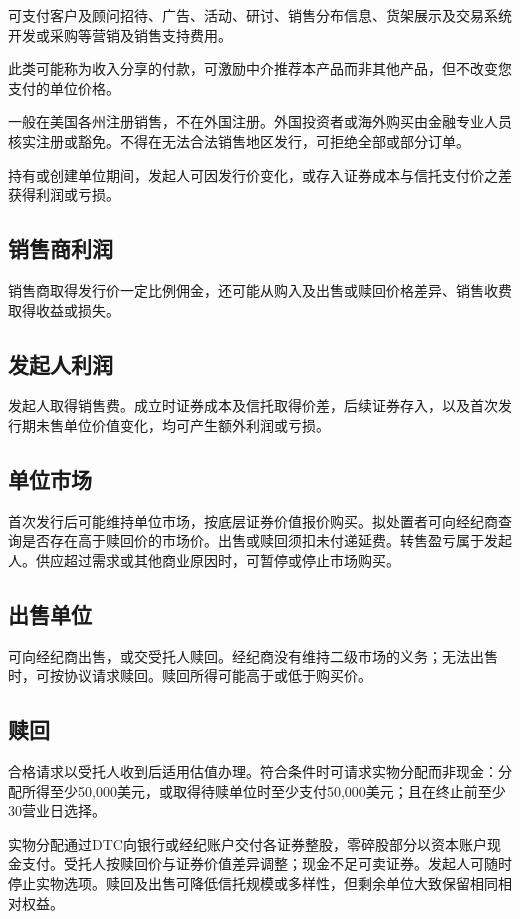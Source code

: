 \documentclass[UTF8,fontset=none,11pt,a4paper]{ctexart}
\begin{document}
可支付客户及顾问招待、广告、活动、研讨、销售分布信息、货架展示及交易系统开发或采购等营销及销售支持费用。


此类可能称为收入分享的付款，可激励中介推荐本产品而非其他产品，但不改变您支付的单位价格。


一般在美国各州注册销售，不在外国注册。外国投资者或海外购买由金融专业人员核实注册或豁免。不得在无法合法销售地区发行，可拒绝全部或部分订单。


持有或创建单位期间，发起人可因发行价变化，或存入证券成本与信托支付价之差获得利润或亏损。


\subsection*{销售商利润}
销售商取得发行价一定比例佣金，还可能从购入及出售或赎回价格差异、销售收费取得收益或损失。


\subsection*{发起人利润}
发起人取得销售费。成立时证券成本及信托取得价差，后续证券存入，以及首次发行期未售单位价值变化，均可产生额外利润或亏损。


\subsection*{单位市场}
首次发行后可能维持单位市场，按底层证券价值报价购买。拟处置者可向经纪商查询是否存在高于赎回价的市场价。出售或赎回须扣未付递延费。转售盈亏属于发起人。供应超过需求或其他商业原因时，可暂停或停止市场购买。


\subsection*{出售单位}
可向经纪商出售，或交受托人赎回。经纪商没有维持二级市场的义务；无法出售时，可按协议请求赎回。赎回所得可能高于或低于购买价。


\subsection*{赎回}
合格请求以受托人收到后适用估值办理。符合条件时可请求实物分配而非现金：分配所得至少50,000美元，或取得待赎单位时至少支付50,000美元；且在终止前至少30营业日选择。


实物分配通过DTC向银行或经纪账户交付各证券整股，零碎股部分以资本账户现金支付。受托人按赎回价与证券价值差异调整；现金不足可卖证券。发起人可随时停止实物选项。赎回及出售可降低信托规模或多样性，但剩余单位大致保留相同相对权益。
\end{document}
